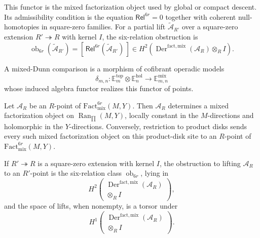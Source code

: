 \begin{defn}
  This functor is the mixed factorization object used by global or
  compact descent.  Its admissibility condition is the equation
  \(\mathsf{Rel}^{6r}=0\) together with coherent
  null-homotopies in square-zero families.  For a partial lift
  \(\widetilde{\mathcal A}_{R'}\) over a square-zero extension
  \(R'\twoheadrightarrow R\) with kernel \(I\), the six-relation
  obstruction is
  \[
    \operatorname{ob}_{6r}(\widetilde{\mathcal A}_{R'})
      =
    [\,\mathsf{Rel}^{6r}(\widetilde{\mathcal A}_{R'})\,]
      \in
    H^2\!\left(
      \operatorname{Der}^{\mathrm{fact,mix}}(\mathcal A_R)\otimes_R I
    \right).
  \]

  A mixed-Dunn comparison is a morphism of cofibrant operadic models
  \[
    \delta_{m,n}\colon
    \mathbb E_m^{\mathrm{top}}\otimes\mathbb E_n^{\mathrm{hol}}
      \longrightarrow
    \mathbb E_{m,n}^{\mathrm{mix}}
  \]
  whose induced algebra functor realizes this functor of points.
\end{defn}

\begin{prop}\label{prop:fact6r-functor-of-points-recognition}
  Let \(\mathcal A_R\) be an \(R\)-point of
  \(\mathrm{Fact}^{6r}_{\mathrm{mix}}(M,Y)\).  Then \(\mathcal A_R\)
  determines a mixed factorization object on
  \(\operatorname{Ran}_{\prod}(M,Y)\), locally constant in the
  \(M\)-directions and holomorphic in the \(Y\)-directions.  Conversely,
  restriction to product disks sends every such mixed factorization
  object on this product-disk site to an \(R\)-point of
  \(\mathrm{Fact}^{6r}_{\mathrm{mix}}(M,Y)\).

  If \(R'\twoheadrightarrow R\) is a square-zero extension with kernel
  \(I\), the obstruction to lifting \(\mathcal A_R\) to an
  \(R'\)-point is the six-relation class
  \(\operatorname{ob}_{6r}\), lying in
  \[
    H^2\!\left(
      \begin{gathered}
        \operatorname{Der}^{\mathrm{fact,mix}}(\mathcal A_R)\\
        \otimes_R I
      \end{gathered}
    \right),
  \]
  and the space of lifts, when nonempty, is a torsor under
  \[
    H^1\!\left(
      \begin{gathered}
        \operatorname{Der}^{\mathrm{fact,mix}}(\mathcal A_R)\\
        \otimes_R I
      \end{gathered}
    \right).
  \]
\end{prop}


